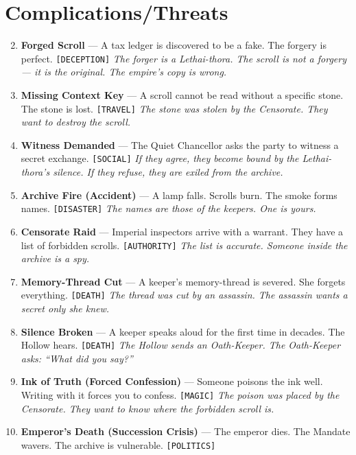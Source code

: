 \section*{ Complications/Threats}
\label{sec:lethai-thora-complications}
\begin{enumerate}
\setcounter{enumi}{1}
\item \textbf{Forged Scroll} --- A tax ledger is discovered to be a fake. The forgery is perfect. \texttt{[DECEPTION]}
  \hfill \textit{The forger is a Lethai-thora. The scroll is not a forgery --- it is the original. The empire's copy is wrong.}
\item \textbf{Missing Context Key} --- A scroll cannot be read without a specific stone. The stone is lost. \texttt{[TRAVEL]}
  \hfill \textit{The stone was stolen by the Censorate. They want to destroy the scroll.}
\item \textbf{Witness Demanded} --- The Quiet Chancellor asks the party to witness a secret exchange. \texttt{[SOCIAL]}
  \hfill \textit{If they agree, they become bound by the Lethai-thora's silence. If they refuse, they are exiled from the archive.}
\item \textbf{Archive Fire (Accident)} --- A lamp falls. Scrolls burn. The smoke forms names. \texttt{[DISASTER]}
  \hfill \textit{The names are those of the keepers. One is yours.}
\item \textbf{Censorate Raid} --- Imperial inspectors arrive with a warrant. They have a list of forbidden scrolls. \texttt{[AUTHORITY]}
  \hfill \textit{The list is accurate. Someone inside the archive is a spy.}
\item \textbf{Memory-Thread Cut} --- A keeper's memory-thread is severed. She forgets everything. \texttt{[DEATH]}
  \hfill \textit{The thread was cut by an assassin. The assassin wants a secret only she knew.}
\item \textbf{Silence Broken} --- A keeper speaks aloud for the first time in decades. The Hollow hears. \texttt{[DEATH]}
  \hfill \textit{The Hollow sends an Oath-Keeper. The Oath-Keeper asks: ``What did you say?''}
\item \textbf{Ink of Truth (Forced Confession)} --- Someone poisons the ink well. Writing with it forces you to confess. \texttt{[MAGIC]}
  \hfill \textit{The poison was placed by the Censorate. They want to know where the forbidden scroll is.}
\item \textbf{Emperor's Death (Succession Crisis)} --- The emperor dies. The Mandate wavers. The archive is vulnerable. \texttt{[POLITICS]}

\end{enumerate}
